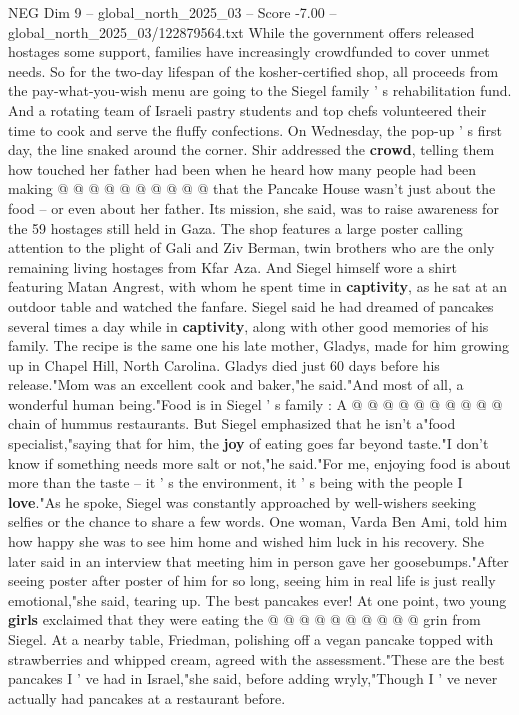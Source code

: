 \begin{textsample}{NEG Dim 9 – global\_north\_2025\_03 – Score -7.00 – global\_north\_2025\_03/122879564.txt}
While the government offers released hostages some support, families have increasingly crowdfunded to cover unmet needs.
So for the two-day lifespan of the kosher-certified shop, all proceeds from the pay-what-you-wish menu are going to the Siegel family ' s rehabilitation fund.
And a rotating team of Israeli pastry students and top chefs volunteered their time to cook and serve the fluffy confections.
On Wednesday, the pop-up ' s first day, the line snaked around the corner.
Shir addressed the \textbf{crowd}, telling them how touched her father had been when he heard how many people had been making @ @ @ @ @ @ @ @ @ @ that the Pancake House wasn't just about the food -- or even about her father.
Its mission, she said, was to raise awareness for the 59 hostages still held in Gaza.
The shop features a large poster calling attention to the plight of Gali and Ziv Berman, twin brothers who are the only remaining living hostages from Kfar Aza.
And Siegel himself wore a shirt featuring Matan Angrest, with whom he spent time in \textbf{captivity}, as he sat at an outdoor table and watched the fanfare.
Siegel said he had dreamed of pancakes several times a day while in \textbf{captivity}, along with other good memories of his family.
The recipe is the same one his late mother, Gladys, made for him growing up in Chapel Hill, North Carolina.
Gladys died just 60 days before his release."Mom was an excellent cook and baker,"he said."And most of all, a wonderful human being."Food is in Siegel ' s family : A @ @ @ @ @ @ @ @ @ @ chain of hummus restaurants.
But Siegel emphasized that he isn't a"food specialist,"saying that for him, the \textbf{joy} of eating goes far beyond taste."I don't know if something needs more salt or not,"he said."For me, enjoying food is about more than the taste -- it ' s the environment, it ' s being with the people I \textbf{love}."As he spoke, Siegel was constantly approached by well-wishers seeking selfies or the chance to share a few words.
One woman, Varda Ben Ami, told him how happy she was to see him home and wished him luck in his recovery.
She later said in an interview that meeting him in person gave her goosebumps."After seeing poster after poster of him for so long, seeing him in real life is just really emotional,"she said, tearing up.
The best pancakes ever!
At one point, two young \textbf{girls} exclaimed that they were eating the @ @ @ @ @ @ @ @ @ @ grin from Siegel.
At a nearby table, Friedman, polishing off a vegan pancake topped with strawberries and whipped cream, agreed with the assessment."These are the best pancakes I ' ve had in Israel,"she said, before adding wryly,"Though I ' ve never actually had pancakes at a restaurant before.

\end{textsample}
